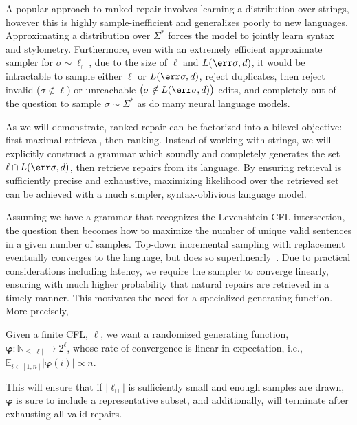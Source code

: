 \documentclass[runningheads]{llncs}
\begin{document}
  A popular approach to ranked repair involves learning a distribution over strings, however this is highly sample-inefficient and generalizes poorly to new languages. Approximating a distribution over $\Sigma^*$ forces the model to jointly learn syntax and stylometry. Furthermore, even with an extremely efficient approximate sampler for $\sigma \sim \ell_\cap$, due to the size of $\ell$ and $L(\err\sigma, d)$, it would be intractable to sample either $\ell$ or $L(\err\sigma, d)$, reject duplicates, then reject invalid ($\sigma \notin \ell$) or unreachable $\big(\sigma \notin L(\err\sigma, d)\big)$ edits, and completely out of the question to sample $\sigma \sim \Sigma^*$ as do many neural language models.

  As we will demonstrate, ranked repair can be factorized into a bilevel objective: first maximal retrieval, then ranking. Instead of working with strings, we will explicitly construct a grammar which soundly and completely generates the set $\ell \cap L(\err\sigma, d)$, then retrieve repairs from its language. By ensuring retrieval is sufficiently precise and exhaustive, maximizing likelihood over the retrieved set can be achieved with a much simpler, syntax-oblivious language model.

  Assuming we have a grammar that recognizes the Levenshtein-CFL intersection, the question then becomes how to maximize the number of unique valid sentences in a given number of samples. Top-down incremental sampling with replacement eventually converges to the language, but does so superlinearly~\cite{flajolet1992birthday}. Due to practical considerations including latency, we require the sampler to converge linearly, ensuring with much higher probability that natural repairs are retrieved in a timely manner. This motivates the need for a specialized generating function. More precisely,

  \begin{definition}\label{def:linear-convergence}
    Given a finite CFL, $\ell$, we want a randomized generating function, $\bm{\varphi}: \mathbb{N}_{\leq|\ell|} \rightarrow 2^\ell$, whose rate of convergence is linear in expectation, i.e., $\mathbb{E}_{i \in [1, n]}|\bm{\varphi}(i)| \propto n$.
  \end{definition}

  \noindent This will ensure that if $|\ell_\cap|$ is sufficiently small and enough samples are drawn, $\bm\varphi$ is sure to include a representative subset, and additionally, will terminate after exhausting all valid repairs.
\end{document}
